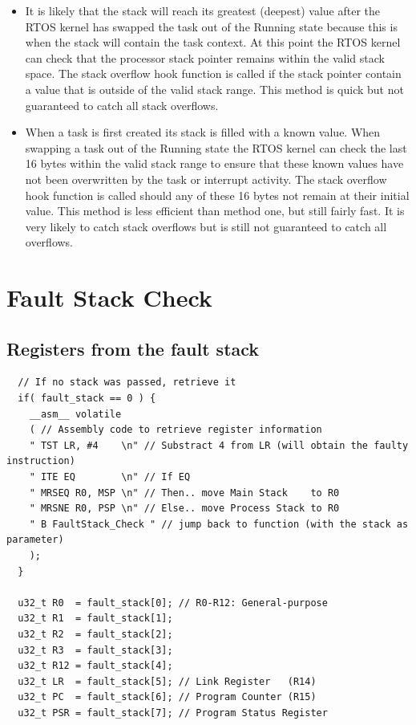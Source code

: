 \begin{itemize}
\item It is likely that the stack will reach its greatest (deepest) value after the RTOS kernel has swapped the task out of the Running state because this is when the stack will contain the task context. At this point the RTOS kernel can check that the processor stack pointer remains within the valid stack space. The stack overflow hook function is called if the stack pointer contain a value that is outside of the valid stack range.
  This method is quick but not guaranteed to catch all stack overflows.

\item When a task is first created its stack is filled with a known value. When swapping a task out of the Running state the RTOS kernel can check the last 16 bytes within the valid stack range to ensure that these known values have not been overwritten by the task or interrupt activity. The stack overflow hook function is called should any of these 16 bytes not remain at their initial value.
  This method is less efficient than method one, but still fairly fast. It is very likely to catch stack overflows but is still not guaranteed to catch all overflows.

\end{itemize}

\section {Fault Stack Check}

\subsection { Registers from the fault stack  }

\begin{lstlisting}
  // If no stack was passed, retrieve it
  if( fault_stack == 0 ) {
    __asm__ volatile
    ( // Assembly code to retrieve register information
    " TST LR, #4    \n" // Substract 4 from LR (will obtain the faulty instruction)
    " ITE EQ        \n" // If EQ
    " MRSEQ R0, MSP \n" // Then.. move Main Stack    to R0
    " MRSNE R0, PSP \n" // Else.. move Process Stack to R0
    " B FaultStack_Check " // jump back to function (with the stack as parameter)
    );
  }

  u32_t R0  = fault_stack[0]; // R0-R12: General-purpose
  u32_t R1  = fault_stack[1];
  u32_t R2  = fault_stack[2];
  u32_t R3  = fault_stack[3];
  u32_t R12 = fault_stack[4];
  u32_t LR  = fault_stack[5]; // Link Register   (R14)
  u32_t PC  = fault_stack[6]; // Program Counter (R15)
  u32_t PSR = fault_stack[7]; // Program Status Register
\end{lstlisting}


